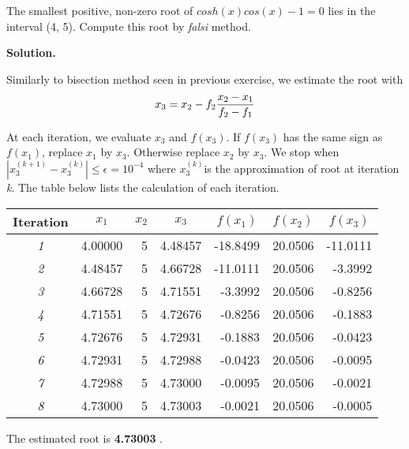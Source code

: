 \begin{exercise}{3} %
The smallest positive, non-zero root of $cosh(x)cos(x)-1=0$ lies in the interval
(4, 5). Compute this root by \textit{falsi} method.

\textbf{Solution.} 

Similarly to bisection method seen in previous exercise, we estimate the root with
\begin{align}
x_3 = x_2 - f_2 \frac{x_2-x_1}{f_2-f_1} \notag
\end{align}

At each iteration, we evaluate \(x_3\) and \(f(x_3)\). If \(f(x_3)\) has the same sign as \(f(x_1)\), replace \(x_1\) by \(x_3\). Otherwise replace \(x_2\) by \(x_3\).
We stop when \(|x_3^{(k+1)}-x_3^{(k)}| \leq \epsilon = 10^{-4}\) where \(x_3^{(k)}\)is the approximation of root at iteration \textit{k}. The table below lists the calculation of each iteration.
\begin{table}[H]
\centering
\begin{tabular}{|c|r|r|r|r|r|r|}
\hline
\textbf{Iteration} & \multicolumn{1}{c|}{\textbf{\(x_1\)}} & \multicolumn{1}{c|}{\textbf{\(x_2\)}} & \multicolumn{1}{c|}{\textbf{\(x_3\)}} & \multicolumn{1}{c|}{\textbf{\(f(x_1)\)}} & \multicolumn{1}{c|}{\textbf{\(f(x_2)\)}} & \multicolumn{1}{c|}{\textbf{\(f(x_3)\)}} \\ \hline
\textit{1} & 4.00000 & 5 & 4.48457 & -18.8499 & 20.0506 & -11.0111 \\ \hline
\textit{2} & 4.48457 & 5 & 4.66728 & -11.0111 & 20.0506 & -3.3992 \\ \hline
\textit{3} & 4.66728 & 5 & 4.71551 & -3.3992 & 20.0506 & -0.8256 \\ \hline
\textit{4} & 4.71551 & 5 & 4.72676 & -0.8256 & 20.0506 & -0.1883 \\ \hline
\textit{5} & 4.72676 & 5 & 4.72931 & -0.1883 & 20.0506 & -0.0423 \\ \hline
\textit{6} & 4.72931 & 5 & 4.72988 & -0.0423 & 20.0506 & -0.0095 \\ \hline
\textit{7} & 4.72988 & 5 & 4.73000 & -0.0095 & 20.0506 & -0.0021 \\ \hline
\textit{8} & 4.73000 & 5 & 4.73003 & -0.0021 & 20.0506 & -0.0005 \\ \hline
\end{tabular}
\end{table}

The estimated root is \textbf{4.73003} .
\end{exercise}
